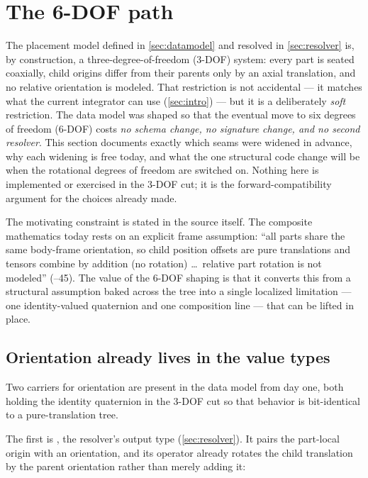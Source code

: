 \section{The 6-DOF path}\label{sec:sixdof}

The placement model defined in \cref{sec:datamodel} and resolved in \cref{sec:resolver} is, by
construction, a three-degree-of-freedom (3-DOF) system: every part is seated coaxially, child
origins differ from their parents only by an axial translation, and no relative orientation is
modeled. That restriction is not accidental --- it matches what the current integrator can use
(\cref{sec:intro}) --- but it is a deliberately \emph{soft} restriction. The data model was shaped
so that the eventual move to six degrees of freedom (6-DOF) costs \emph{no schema change, no
signature change, and no second resolver}. This section documents exactly which seams were widened
in advance, why each widening is free today, and what the one structural code change will be when
the rotational degrees of freedom are switched on. Nothing here is implemented or exercised in the
3-DOF cut; it is the forward-compatibility argument for the choices already made.

The motivating constraint is stated in the source itself. The composite mathematics today rests on
an explicit frame assumption: ``all parts share the same body-frame orientation, so child position
offsets are pure translations and tensors combine by addition (no rotation) \ldots\ relative part
rotation is not modeled'' (--45). The value of the 6-DOF shaping is that
it converts this from a structural assumption baked across the tree into a single localized
limitation --- one identity-valued quaternion and one composition line --- that can be lifted in
place.

\subsection{Orientation already lives in the value types}

Two carriers for orientation are present in the data model from day one, both holding the identity
quaternion in the 3-DOF cut so that behavior is bit-identical to a pure-translation tree.

The first is , the resolver's output type (\cref{sec:resolver}). It pairs the part-local
origin with an orientation, and its  operator already rotates the child translation by
the parent orientation rather than merely adding it:

